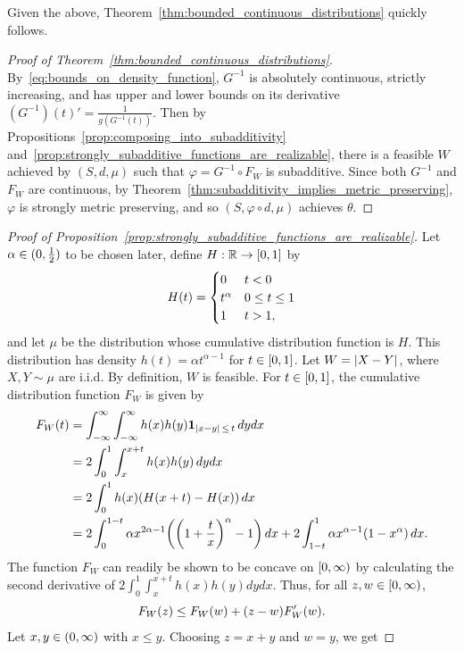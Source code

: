\documentclass[10pt]{amsart}
\theoremstyle{definition}\newtheorem{defi}[theo]{Definition}\newtheorem{rema}[theo]{Remark}\newtheorem{exam}[theo]{Example}\newtheorem{exem}[theo]{Example}\newtheorem{nota}[theo]{Notation}
\renewcommand*\r{\mathbb{R}}
\newcommand*\one{\mathbf{1}}
\newcommand*\nonnegative{\left[0,\infty\right)}
\newcommand*\abs[1]{\left|#1\right|}
\let\originalleft\left
\let\originalright\right
\renewcommand{\left}{\mathopen{}\mathclose\bgroup\originalleft}
\renewcommand{\right}{\aftergroup\egroup\originalright}
\renewcommand*{\to}{\mathchoice{\longrightarrow}{\rightarrow}{\rightarrow}{\rightarrow}}
\let\oldin\in
\renewcommand{\in}{\mathchoice{\oldin}{\oldin}{\,\oldin\,}{\,\oldin\,}}
\begin{document}
Given the above, Theorem~\ref{thm:bounded_continuous_distributions} quickly follows.
\begin{proof}[Proof of Theorem~\ref{thm:bounded_continuous_distributions}]
By~\eqref{eq:bounds_on_density_function}, $G^{-1}$ is absolutely continuous, strictly increasing, and has upper and lower bounds on its derivative $(G^{-1})(t)'=\frac{1}{g(G^{-1}(t))}$. Then by Propositions~\ref{prop:composing_into_subadditivity} and~\ref{prop:strongly_subadditive_functions_are_realizable}, there is a feasible $W$ achieved by $(S,d,\mu)$ such that $\varphi=G^{-1}\circ F_{W}$ is subadditive. Since both $G^{-1}$ and $F_{W}$ are continuous, by Theorem~\ref{thm:subadditivity_implies_metric_preserving}, $\varphi$ is strongly metric preserving, and so $(S,\varphi\circ d,\mu)$ achieves $\theta$.
\end{proof}
\begin{proof}[Proof of Proposition~\ref{prop:strongly_subadditive_functions_are_realizable}]
Let $\alpha\in(0,\frac{1}{2})$ to be chosen later, define $H:\r\to[0,1]$ by
\[
H\left(t\right)=
\begin{cases}
0 & t<0\\
t^{\alpha} & 0\leq t\leq1\\
1 & t>1,
\end{cases}
\]
and let $\mu$ be the distribution whose cumulative distribution function is $H$. This distribution has density $h(t)=\alpha t^{\alpha-1}$ for $t\in[0,1]$. Let $W=\abs{X-Y}$, where $X,Y\sim\mu$ are i.i.d. By definition, $W$ is feasible. For $t\in[0,1]$, the cumulative distribution function $F_{W}$ is given by
\begin{align*}
F_{W}\left(t\right) & =\int_{-\infty}^{\infty}\int_{-\infty}^{\infty}h\left(x\right)h\left(y\right)\one_{\abs{x-y}\,\leq\,t}\,dydx\\
& =2\int_{0}^{1}\int_{x}^{x+t}h\left(x\right)h\left(y\right)\,dydx\\
& =2\int_{0}^{1}h\left(x\right)\left(H\left(x+t\right)-H\left(x\right)\right)\,dx\\
& =2\int_{0}^{1-t}\alpha x^{2\alpha-1}\left(\left(1+\frac{t}{x}\right)^{\alpha}-1\right)\,dx+2\int_{1-t}^{1}\alpha x^{\alpha-1}\left(1-x^{\alpha}\right)\,dx.
\end{align*}
The function $F_{W}$ can readily be shown to be concave on $\nonnegative$ by calculating the second derivative of $2\int_{0}^{1}\int_{x}^{x+t}h(x)h(y)dydx$. Thus, for all $z,w\in\nonnegative$,
\[
F_{W}\left(z\right)\leq F_{W}\left(w\right)+\left(z-w\right)F_{W}'\left(w\right).
\]
Let $x,y\in(0,\infty)$ with $x\leq y$. Choosing $z=x+y$ and $w=y$, we get

\end{proof}
\end{document}
